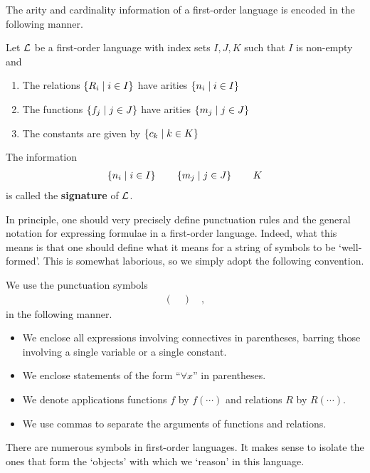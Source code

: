 The arity and cardinality information of a first-order language is encoded in the following manner.

\begin{boxdefinition}[Signature]
    Let $\mathcal{L}$ be a first-order language with index sets $I, J, K$ such that $I$ is non-empty and
    \begin{enumerate}
        \item The relations $\left\{ R_i \; \middle\vert \; i \in I \right\}$ have arities $\left\{ n_i \; \middle\vert \; i \in I \right\}$
        \item The functions $\left\{ f_j \; \middle\vert \; j \in J \right\}$ have arities $\left\{ m_j \; \middle\vert \; j \in J \right\}$
        \item The constants are given by $\left\{ c_k \; \middle\vert \; k \in K \right\}$
    \end{enumerate}
    The information
    \begin{align*}
        \left\{ n_i \; \middle\vert \; i \in I \right\}
        \qquad
        \left\{ m_j \; \middle\vert \; j \in J \right\}
        \qquad
        K
    \end{align*}
    is called the \textbf{signature} of $\mathcal{L}$.
\end{boxdefinition}

In principle, one should very precisely define punctuation rules and the general notation for expressing formulae in a first-order language. Indeed, what this means is that one should define what it means for a string of symbols to be `well-formed'. This is somewhat laborious, so we simply adopt the following convention.

\begin{boxconvention}
    We use the punctuation symbols
    \begin{align*}
        ( \quad ) \quad ,
    \end{align*}
    in the following manner.
    \begin{itemize}
        \item We enclose all expressions involving connectives in parentheses, barring those involving a single variable or a single constant.
        \item We enclose statements of the form ``$\forall x$'' in parentheses.
        \item We denote applications functions $f$ by $f(\cdots)$ and relations $R$ by $R(\cdots)$.
        \item We use commas to separate the arguments of functions and relations.
    \end{itemize}
\end{boxconvention}

There are numerous symbols in first-order languages. It makes sense to isolate the ones that form the `objects' with which we `reason' in this language.

